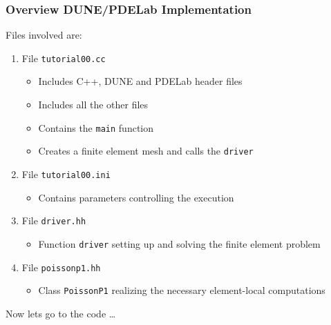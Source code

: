 \documentclass[ignorenonframetext,11pt]{beamer}
\theoremstyle{definition}
\begin{document}
\begin{frame}
\frametitle{Overview DUNE/PDELab Implementation}
Files involved are:
\begin{enumerate}[1)]
\item File \lstinline{tutorial00.cc} 
\begin{itemize}
\item Includes C++, DUNE and PDELab header files 
\item Includes all the other files 
\item Contains the \lstinline{main} function
\item Creates a finite element mesh and calls the \lstinline{driver}
\end{itemize}
\item File \lstinline{tutorial00.ini} 
\begin{itemize}
\item Contains parameters controlling the execution
\end{itemize}
\item File \lstinline{driver.hh}
\begin{itemize}
\item Function \lstinline{driver} setting up and solving the finite element problem
\end{itemize}
\item File \lstinline{poissonp1.hh} 
\begin{itemize}
\item Class \lstinline{PoissonP1} 
realizing the necessary element-local computations
\end{itemize}
\end{enumerate}
Now lets go to the code \ldots
\end{frame}
\end{document}
